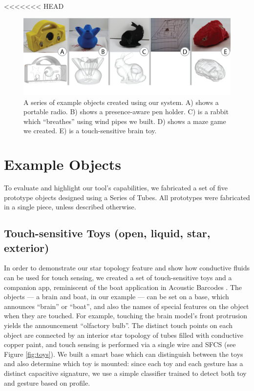 
<<<<<<< HEAD
\begin{figure}
\centering
    \includegraphics[width=7in]{figures/examples.png}
\caption{A series of example objects created using our system.  A) shows a portable radio.  B) shows a presence-aware pen holder.  C) is a rabbit which ``breathes'' using wind pipes we built.  D) shows a maze game we created.  E) is a touch-sensitive brain toy.  }
\label{fig:examples}
\end{figure}

\section{Example Objects}

To evaluate and highlight our tool's capabilities, we fabricated a set of five prototype objects designed using a Series of Tubes.  All prototypes were fabricated in a single piece, unless described otherwise.

\subsection{Touch-sensitive Toys (open, liquid, star, exterior)}

In order to demonstrate our star topology feature and show how conductive fluids can be used for touch sensing, we created a set of touch-sensitive toys and a companion app, reminiscent of the boat application in Acoustic Barcodes \cite{Harrison-acoustic}. The objects --- a brain and boat, in our example --- can be set on a base, which announces ``brain'' or ``boat'', and also the names of special features on the object when they are touched. For example, touching the brain model's front protrusion yields the announcement ``olfactory bulb''. The distinct touch points on each object are connected by an interior star topology of tubes filled with conductive copper paint, and touch sensing is performed via a single wire and SFCS (see Figure \ref{fig:toys}).  We built a smart base which can distinguish between the toys and also determine which toy is mounted: since each toy and each gesture has a distinct capacitive signature, we use a simple classifier trained to detect both toy and gesture based on profile.


